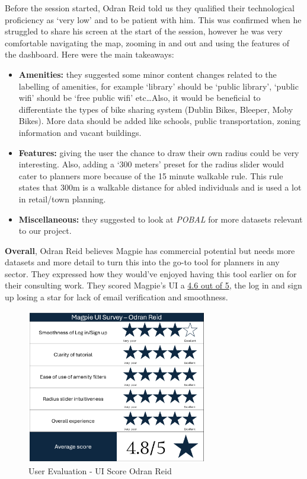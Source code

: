 Before the session started, Odran Reid told us they qualified their
technological proficiency as `very low' and to be patient with him. This was
confirmed when he struggled to share his screen at the start of the session,
however he was very comfortable navigating the map, zooming in and out and using
the features of the dashboard. Here were the main takeaways:
\begin{itemize}
    \item \textbf{Amenities:} they suggested some minor content changes related to the
          labelling of amenities, for example `library' should be `public library',
          `public wifi' should be `free public wifi' etc\ldots Also, it would be
          beneficial to differentiate the types of bike sharing system (Dublin Bikes,
          Bleeper, Moby Bikes). More data should be added like schools, public
          transportation, zoning information and vacant buildings.
          \vspace{0.2cm}
          
    \item \textbf{Features:} giving the user the chance to draw their own radius
          could be very interesting. Also, adding a `300 meters' preset for the radius
          slider would cater to planners more because of the 15 minute walkable
          rule. This rule states that 300m is a walkable distance for abled
          individuals and is used a lot in retail/town planning.
          \vspace{0.2cm}
          
    \item \textbf{Miscellaneous:} they suggested to look at \emph{POBAL} for
          more datasets relevant to our project.
          \vspace{0.2cm}
\end{itemize}
\textbf{Overall}, Odran Reid believes Magpie has commercial potential but needs
more datasets and more detail to turn this into the go-to tool for planners in
any sector. They expressed how they would've enjoyed having this tool earlier on
for their consulting work. They scored Magpie's UI a \underline{4.6 out of 5},
the log in and sign up losing a star for lack of email verification and
smoothness.

\begin{figure}[h!]
    \centering
    \includegraphics[width=0.7\textwidth]{images/survey-odran.png}
    \caption{User Evaluation - UI Score Odran Reid}
\end{figure}

